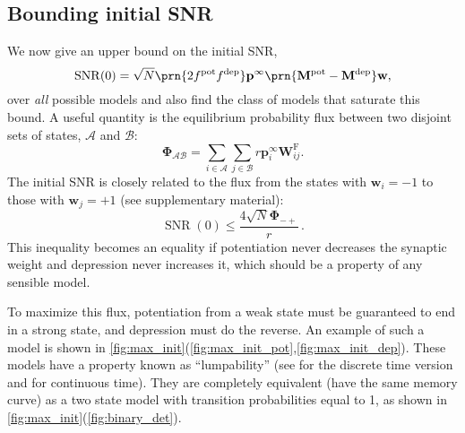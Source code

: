 \documentclass{article} %
\DeclareMathOperator{\snr}{SNR}
\newcommand{\pr}{\mathbf{p}}
\newcommand{\eq}{\pr^\infty}
\newcommand{\w}{\mathbf{w}}
\newcommand{\W}{\mathbf{W}}
\newcommand{\M}{\mathbf{M}}
\newcommand{\frg}{\W^{\mathrm{F}}}
\newcommand{\F}{\boldsymbol{\Phi}}
\newcommand{\pot}{^{\text{pot}}}
\newcommand{\dep}{^{\text{dep}}}
\newcommand{\CA}{\mathcal{A}}
\newcommand{\CB}{\mathcal{B}}
\begin{document}
\subsection{Bounding initial SNR}\label{sec:initial}

We now give an upper bound on the initial SNR,
%
\begin{equation}\label{eq:init}
  \snr(0) = \sqrt{N}\prn{2 f\pot f\dep} \eq \prn{\M\pot-\M\dep} \w,
\end{equation}
%
over \emph{all} possible models and also find the class of models that saturate this bound.
A useful quantity is the equilibrium probability flux between two disjoint sets of states, $\CA$ and $\CB$:
%
\begin{equation}\label{eq:flux}
  \F_{\CA\CB} = \sum_{i\in\CA} \sum_{j\in\CB} r \eq_i \frg_{ij}.
\end{equation}
%
The initial SNR is closely related to the flux from the states with $\w_i=-1$ to those with $\w_j=+1$ (see supplementary material):
%
\begin{equation}\label{eq:initflux}
  \snr(0) \leq \frac{4\sqrt{N}\F_{-+}}{r}\,.
\end{equation}
%
This inequality becomes an equality if potentiation never decreases the synaptic weight and depression never increases it, which should be a property of any sensible model.

To maximize this flux, potentiation from a weak state must be guaranteed to end in a strong state, and depression must do the reverse.
An example of such a model is shown in \autoref{fig:max_init}(\ref{fig:max_init_pot},\ref{fig:max_init_dep}).
These models have a property known as ``lumpability'' (see \cite[\S6.3]{kemeny1960finite} for the discrete time version and \cite{burke1958markovian,Ball1993Lumpability} for continuous time).
They are completely equivalent (\ie have the same memory curve) as a two state model with transition probabilities equal to 1, as shown in \autoref{fig:max_init}(\ref{fig:binary_det}).
\end{document}
